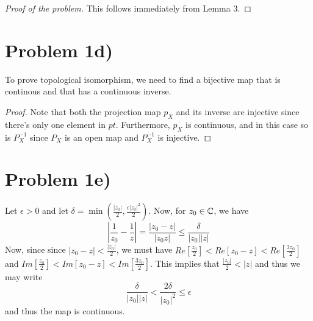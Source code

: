 \begin{proof}[Proof of the problem]

This follows immediately from Lemma 3. 

\end{proof}
\section*{Problem 1d)}
To prove topological isomorphism, we need to find a bijective map that is  continous and that has a continuous inverse.
\begin{proof}
 Note that both the projection map $p_X$ and its inverse are injective since there's only one element in ${pt}$. Furthermore, $p_X$ is continuous, and in this case so is $P_X^{-1}$ since $P_X$ is an open map and  $P_X^{-1}$ is injective. 
\end{proof}
\section*{Problem 1e)}
Let $\epsilon>0$ and let $\delta=\min(\frac{|z_0|}{2},\frac{\epsilon |z_0|^2}{2})$. 
Now, for $z_0\in \mathbb{C}$, we have
\[ \left| \frac{1}{z_0} - \frac{1}{z} \right| = \frac{|z_0 - z|}{|z_0z|}  \leq \frac{\delta}{|z_0||z|} \]
Now, since since $|z_0 - z| < \frac{|z_0|}{2}$, we must have $Re[\frac{z_0}{2}]<Re[z_0 - z]<Re[\frac{3z_0}{2}]$ and $Im[\frac{z_0}{2}]<Im[z_0 - z]<Im[\frac{3z_0}{2}]$. This implies that $\frac{|z_0|}{2}<|z|$ and thus we may write 
\[ \frac{\delta}{|z_0||z|}  < \frac{2\delta}{|z_0|^2} \leq \epsilon \]
and thus the map is continuous. 
